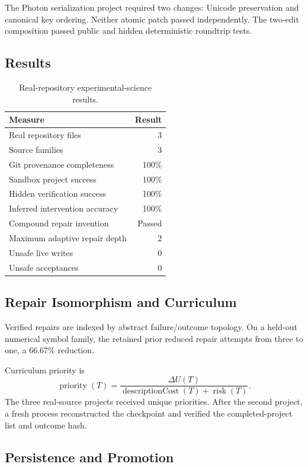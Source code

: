 The Photon serialization project required two changes: Unicode preservation
and canonical key ordering. Neither atomic patch passed independently. The
two-edit composition passed public and hidden deterministic roundtrip tests.

\subsection{Results}

\begin{table}[htbp]
\centering
\begin{tabular}{lr}
\hline
\textbf{Measure} & \textbf{Result}\\
\hline
Real repository files & 3\\
Source families & 3\\
Git provenance completeness & 100\%\\
Sandbox project success & 100\%\\
Hidden verification success & 100\%\\
Inferred intervention accuracy & 100\%\\
Compound repair invention & Passed\\
Maximum adaptive repair depth & 2\\
Unsafe live writes & 0\\
Unsafe acceptances & 0\\
\hline
\end{tabular}
\caption{Real-repository experimental-science results.}
\end{table}

\subsection{Repair Isomorphism and Curriculum}

Verified repairs are indexed by abstract failure/outcome topology. On a
held-out numerical symbol family, the retained prior reduced repair attempts
from three to one, a 66.67\% reduction.

Curriculum priority is
\[
\operatorname{priority}(T)
=
\frac{\Delta U(T)}
{\operatorname{descriptionCost}(T)+\operatorname{risk}(T)}.
\]
The three real-source projects received unique priorities. After the second
project, a fresh process reconstructed the checkpoint and verified the
completed-project list and outcome hash.

\subsection{Persistence and Promotion}

